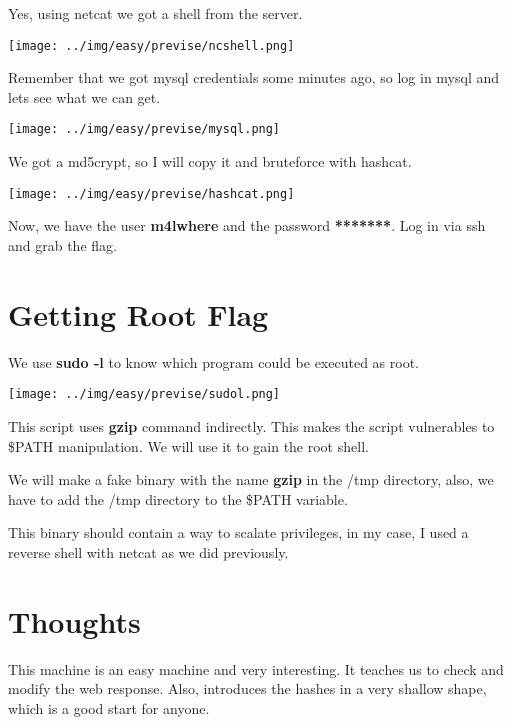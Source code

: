 \documentclass[a4paper]{article} %
\begin{document}
    Yes, using netcat we got a shell from the server.

    \begin{center}
        \texttt{[image: ../img/easy/previse/ncshell.png]}
    \end{center}

    Remember that we got mysql credentials some minutes ago, so log in mysql
    and lets see what we can get.

    \begin{center}
        \texttt{[image: ../img/easy/previse/mysql.png]}
    \end{center}

    We got a md5crypt, so I will copy it and bruteforce with hashcat.

    \begin{center}
        \texttt{[image: ../img/easy/previse/hashcat.png]}
    \end{center}

    Now, we have the user \textbf{m4lwhere} and the password \textbf{*******}.
    Log in via ssh and grab the flag.

    \section{Getting Root Flag}
    We use \textbf{sudo -l} to know which program could be executed as root.

    \begin{center}
        \texttt{[image: ../img/easy/previse/sudol.png]}
    \end{center}

    This script uses \textbf{gzip} command indirectly. This makes the script
    vulnerables to \$PATH manipulation. We will use it to gain the root shell.
    \par
    We will make a fake binary with the name \textbf{gzip} in the /tmp directory,
    also, we have to add the /tmp directory to the \$PATH variable.
    \par
    This binary should contain a way to scalate privileges, in my case, I used a
    reverse shell with netcat as we did previously.

    \section{Thoughts}
    This machine is an easy machine and very interesting. It teaches us to check
    and modify the web response. Also, introduces the hashes in a very shallow
    shape, which is a good start for anyone.
\end{document}
